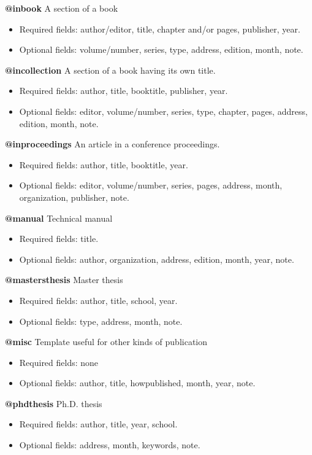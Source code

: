 \documentclass[a4paper,12pt]{article}
\begin{document}
\textbf{@inbook}
A section of a book
\begin{itemize}
\item Required fields: author/editor, title, chapter and/or pages, publisher, year.
\item Optional fields: volume/number, series, type, address, edition, month,
  note.
\end{itemize}

\textbf{@incollection}
A section of a book having its own title.
\begin{itemize}
\item Required fields: author, title, booktitle, publisher, year.
\item Optional fields: editor, volume/number, series, type, chapter, pages,
  address, edition, month, note.
\end{itemize}

\textbf{@inproceedings}
An article in a conference proceedings.
\begin{itemize}
\item Required fields: author, title, booktitle, year.
\item Optional fields: editor, volume/number, series, pages, address, month,
  organization, publisher, note.
\end{itemize}

\textbf{@manual}
Technical manual
\begin{itemize}
\item Required fields: title.
\item Optional fields: author, organization, address, edition, month, year,
  note.
\end{itemize}

\textbf{@mastersthesis}
Master thesis
\begin{itemize}
\item Required fields: author, title, school, year.
\item Optional fields: type, address, month, note.
\end{itemize}

\textbf{@misc}
Template useful for other kinds of publication
\begin{itemize}
\item Required fields: none
\item Optional fields: author, title, howpublished, month, year, note.
\end{itemize}

\textbf{@phdthesis}
Ph.D. thesis
\begin{itemize}
\item Required fields: author, title, year, school.
\item Optional fields: address, month, keywords, note.
\end{itemize}
\end{document}
